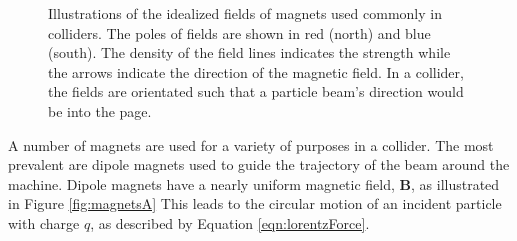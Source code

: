 
\begin{figure}[h!]
\captionsetup[subfigure]{position=b}
\centering
{}
\caption{Illustrations of the idealized fields of magnets used commonly in colliders. The poles of fields are shown in red (north) and blue (south). The density of the field lines indicates the strength while the arrows indicate the direction of the magnetic field. In a collider, the fields are orientated such that a particle beam's direction would be into the page.}
\label{fig:magnets}
\end{figure}

A number of magnets are used for a variety of purposes in a collider.
The most prevalent are dipole magnets used to guide the trajectory of the beam around the machine.
Dipole magnets have a nearly uniform magnetic field, $\pmb B$, as illustrated in Figure \ref{fig:magnetsA}
This leads to the circular motion of an incident particle with charge $q$, as described by Equation \ref{eqn:lorentzForce}.

